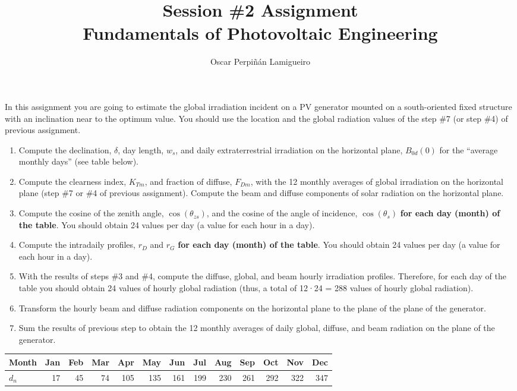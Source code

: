 \documentclass[11pt]{article}
\author{Oscar Perpiñán Lamigueiro}
\date{}
\title{Session \#2 Assignment\\\medskip
\large Fundamentals of Photovoltaic Engineering}
\begin{document}
\maketitle
In this assignment you are going to estimate the global irradiation incident on a PV generator mounted on a south-oriented fixed structure with an inclination near to the optimum value. You should use the location and the global radiation values of the step \#7 (or step \#4) of previous assignment.

\begin{enumerate}
\item Compute the declination, \(\delta\), day length, \(w_s\), and daily extraterrestrial irradiation on the horizontal plane, \(B_{0d}(0)\) for the ``average monthly days'' (see table below).

\item Compute the clearness index, \(K_{Tm}\), and fraction of diffuse, \(F_{Dm}\), with the 12 monthly averages of global irradiation on the horizontal plane (step \#7 or \#4 of previous assignment). Compute the beam and diffuse components of solar radiation on the horizontal plane.

\item Compute the cosine of the zenith angle, \(\cos(\theta_{zs})\), and the cosine of the angle of incidence, \(\cos(\theta_s)\) \textbf{for each day (month) of the table}. You should obtain 24 values per day (a value for each hour in a day).

\item Compute the intradaily profiles, \(r_D\) and \(r_G\) \textbf{for each day (month) of the table}. You should obtain 24 values per day (a value for each hour in a day).

\item With the results of steps \#3 and \#4, compute the diffuse, global, and beam hourly irradiation profiles. Therefore, for each day of the table you should obtain 24 values of hourly global radiation (thus, a total of 12·24 = 288 values of hourly global radiation).

\item Transform the hourly beam and diffuse radiation components on the horizontal plane to the plane of the plane of the generator.

\item Sum the results of previous step to obtain the 12 monthly averages of daily global, diffuse, and beam radiation on the plane of the generator.
\end{enumerate}


\begin{center}
\begin{tabular}{lrrrrrrrrrrrr}
Month & Jan & Feb & Mar & Apr & May & Jun & Jul & Aug & Sep & Oct & Nov & Dec\\
\hline
\(d_n\) & 17 & 45 & 74 & 105 & 135 & 161 & 199 & 230 & 261 & 292 & 322 & 347\\
\end{tabular}
\end{center}
\end{document}
